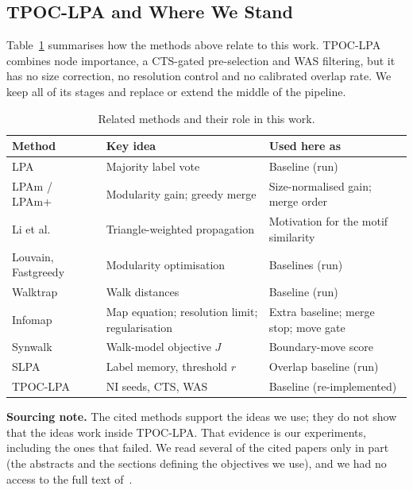 \documentclass[conference]{IEEEtran}
\begin{document}
\subsection{TPOC-LPA and Where We Stand}
Table~\ref{tab:related} summarises how the methods above relate to this work. TPOC-LPA~\cite{kong2026} combines node importance, a CTS-gated pre-selection and WAS filtering, but it has no size correction, no resolution control and no calibrated overlap rate. We keep all of its stages and replace or extend the middle of the pipeline.
\begin{table}[H]
\centering
\caption{Related methods and their role in this work.}
\label{tab:related}
\scriptsize
\begin{tabular}{>{\raggedright\arraybackslash}p{19mm}>{\raggedright\arraybackslash}p{26mm}>{\raggedright\arraybackslash}p{29mm}}
\toprule
Method & Key idea & Used here as \\
\midrule
LPA~\cite{raghavan2007} & Majority label vote & Baseline (run) \\
LPAm / LPAm+~\cite{barber2009,liu2010} & Modularity gain; greedy merge & Size-normalised gain; merge order \\
Li et al.~\cite{li2020motif} & Triangle-weighted propagation & Motivation for the motif similarity \\
Louvain, Fastgreedy~\cite{blondel2008,clauset2004} & Modularity optimisation & Baselines (run) \\
Walktrap~\cite{pons2006} & Walk distances & Baseline (run) \\
Infomap~\cite{rosvall2008,kawamoto2015,smiljanic2020} & Map equation; resolution limit; regularisation & Extra baseline; merge stop; move gate \\
Synwalk~\cite{toth2022} & Walk-model objective $J$ & Boundary-move score \\
SLPA~\cite{xie2011} & Label memory, threshold $r$ & Overlap baseline (run) \\
TPOC-LPA~\cite{kong2026} & NI seeds, CTS, WAS & Baseline (re-implemented) \\
\bottomrule
\end{tabular}
\end{table}
\textbf{Sourcing note.} The cited methods support the ideas we use; they do not show that the ideas work inside TPOC-LPA. That evidence is our experiments, including the ones that failed. We read several of the cited papers only in part (the abstracts and the sections defining the objectives we use), and we had no access to the full text of~\cite{li2020motif}.
\end{document}
